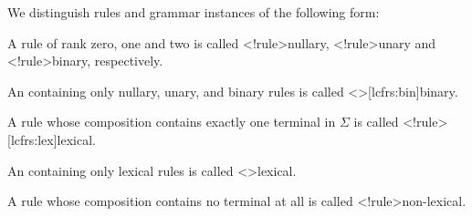\documentclass[../../document.tex]{subfiles}
\begin{document}
    \begin{definition}We distinguish rules and grammar instances of the following form:
        \begin{compactitem}
            \item A rule of rank zero, one and two is called <\lcfrs!rule>{nullary}, <\lcfrs!rule>{unary} and <\lcfrs!rule>{binary}, respectively.
            \item An  containing only nullary, unary, and binary rules is called <\lcfrs>[lcfrs:bin]{binary}.
            \item A rule whose composition contains exactly one terminal in \(\varSigma\) is called <\lcfrs!rule>[lcfrs:lex]{lexical}.
            \item An  containing only lexical rules is called <\lcfrs>{lexical}.
            \item A rule whose composition contains no terminal at all is called <\lcfrs!rule>{non-lexical}.
        \end{compactitem}
    \end{definition}
\end{document}
